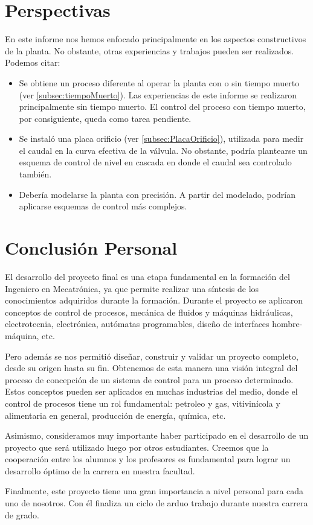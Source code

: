 \section{Perspectivas}
\label{sec:Perspectivas}
En este informe nos hemos enfocado principalmente en los aspectos constructivos
de la planta.
No obstante, otras experiencias y trabajos pueden ser realizados. Podemos citar:
\begin{itemize}
 \item Se obtiene un proceso diferente al operar la planta con o sin tiempo
muerto (ver \ref{subsec:tiempoMuerto}).
Las experiencias de este informe se realizaron principalmente sin tiempo
muerto.
El control del proceso con tiempo muerto, por consiguiente, queda como tarea
pendiente.
\item Se instaló una placa orificio (ver \ref{subsec:PlacaOrificio}), utilizada
para medir el caudal en la curva efectiva de la válvula.
No obstante, podría plantearse un esquema de control de nivel en cascada en
donde el caudal sea controlado también.
\item Debería modelarse la planta con precisión.
A partir del modelado, podrían aplicarse esquemas de control más
complejos.
\end{itemize}

\section{Conclusión Personal}
\label{sec:ConclusionPersonal}

El desarrollo del proyecto final es una etapa fundamental en la formación del
Ingeniero en Mecatrónica, ya que permite realizar una síntesis de los
conocimientos adquiridos durante la formación.
Durante el proyecto se aplicaron conceptos de control de
procesos, mecánica de fluidos y máquinas hidráulicas, electrotecnia,
electrónica, autómatas programables, diseño de interfaces hombre-máquina, etc.

Pero además se nos permitió diseñar, construir y validar un proyecto completo,
desde su origen hasta su fin.
Obtenemos de esta manera una visión integral del proceso de concepción de un
sistema de control para un proceso determinado.
Estos conceptos pueden ser aplicados en muchas industrias del medio, donde el
control de procesos tiene un rol fundamental: petroleo y gas, vitivinícola y
alimentaria en general, producción de energía, química, etc.

Asimismo, consideramos muy importante haber participado en el desarrollo de un
proyecto que será utilizado luego por otros estudiantes.
Creemos que la cooperación entre los alumnos y los profesores es fundamental
para lograr un desarrollo óptimo de la carrera en nuestra facultad.

Finalmente, este proyecto tiene una gran importancia a nivel personal para cada
uno de nosotros.
Con él finaliza un ciclo de arduo trabajo durante nuestra
carrera de grado.
